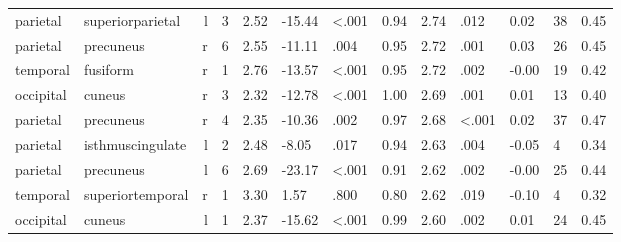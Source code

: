 \documentclass{article}
\begin{document}
\begin{longtable}{llrR{1.3cm}R{1cm}R{1.3cm}R{1cm}R{1cm}R{1.3cm}R{1cm}R{1.8cm}R{1.3cm}R{1.8cm}}
  parietal &          superiorparietal &    l &         3 &                  2.52 &           -15.44 &      \textless.001 &                               0.94 &                          2.74 &                            .012 &   0.02 &     38 &      0.45 \\
  parietal &                 precuneus &    r &         6 &                  2.55 &           -11.11 &               .004 &                               0.95 &                          2.72 &                            .001 &   0.03 &     26 &      0.45 \\
  temporal &                  fusiform &    r &         1 &                  2.76 &           -13.57 &      \textless.001 &                               0.95 &                          2.72 &                            .002 &  -0.00 &     19 &      0.42 \\
 occipital &                    cuneus &    r &         3 &                  2.32 &           -12.78 &      \textless.001 &                               1.00 &                          2.69 &                            .001 &   0.01 &     13 &      0.40 \\
  parietal &                 precuneus &    r &         4 &                  2.35 &           -10.36 &               .002 &                               0.97 &                          2.68 &                   \textless.001 &   0.02 &     37 &      0.47 \\
  parietal &          isthmuscingulate &    l &         2 &                  2.48 &            -8.05 &               .017 &                               0.94 &                          2.63 &                            .004 &  -0.05 &      4 &      0.34 \\
  parietal &                 precuneus &    l &         6 &                  2.69 &           -23.17 &      \textless.001 &                               0.91 &                          2.62 &                            .002 &  -0.00 &     25 &      0.44 \\
  temporal &          superiortemporal &    r &         1 &                  3.30 &             1.57 &               .800 &                               0.80 &                          2.62 &                            .019 &  -0.10 &      4 &      0.32 \\
 occipital &                    cuneus &    l &         1 &                  2.37 &           -15.62 &      \textless.001 &                               0.99 &                          2.60 &                            .002 &   0.01 &     24 &      0.45 \\

\end{longtable}
\end{document}
